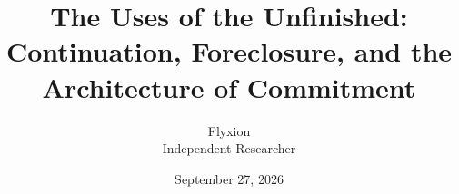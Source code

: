 \documentclass[11pt]{article}
\title{The Uses of the Unfinished:\\[0.3em]
\large Continuation, Foreclosure, and the Architecture of Commitment}
\author{Flyxion\\ \small Independent Researcher}
\date{September 27, 2026}
\theoremstyle{definition}
\theoremstyle{remark}
\begin{document}
\maketitle


\tableofcontents
\bigskip






\end{document}
